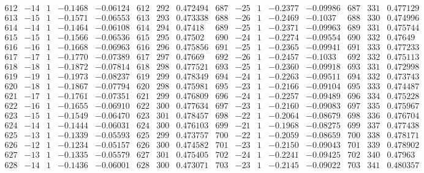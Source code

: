 \documentclass[11pt,reqno,a4letter]{article}
\numberwithin{figure}{section}
\numberwithin{table}{section}
\theoremstyle{plain}
\numberwithin{theorem}{section}
\theoremstyle{definition}
\begin{document}
\begin{table}[ht]
\begin{equation*}
{\begin{array}{ccccc|ccc|ccccc|ccc}
 612 & -14 & 1 & -0.1468 & -0.06124 & 612 & 292 & 0.472494 & 687 & -25 & 1 & -0.2377 & -0.09986 & 687 & 331 & 0.477129 \\
 613 & -15 & 1 & -0.1571 & -0.06553 & 613 & 293 & 0.473338 & 688 & -26 & 1 & -0.2469 & -0.1037 & 688 & 330 & 0.474996 \\
 614 & -14 & 1 & -0.1464 & -0.06108 & 614 & 294 & 0.47418 & 689 & -25 & 1 & -0.2371 & -0.09963 & 689 & 331 & 0.475744 \\
 615 & -15 & 1 & -0.1566 & -0.06536 & 615 & 295 & 0.47502 & 690 & -24 & 1 & -0.2274 & -0.09554 & 690 & 332 & 0.47649 \\
 616 & -16 & 1 & -0.1668 & -0.06963 & 616 & 296 & 0.475856 & 691 & -25 & 1 & -0.2365 & -0.09941 & 691 & 333 & 0.477233 \\
 617 & -17 & 1 & -0.1770 & -0.07389 & 617 & 297 & 0.47669 & 692 & -26 & 1 & -0.2457 & -0.1033 & 692 & 332 & 0.475113 \\
 618 & -18 & 1 & -0.1872 & -0.07814 & 618 & 298 & 0.477521 & 693 & -25 & 1 & -0.2360 & -0.09918 & 693 & 331 & 0.472998 \\
 619 & -19 & 1 & -0.1973 & -0.08237 & 619 & 299 & 0.478349 & 694 & -24 & 1 & -0.2263 & -0.09511 & 694 & 332 & 0.473743 \\
 620 & -18 & 1 & -0.1867 & -0.07794 & 620 & 298 & 0.475981 & 695 & -23 & 1 & -0.2166 & -0.09104 & 695 & 333 & 0.474487 \\
 621 & -17 & 1 & -0.1761 & -0.07351 & 621 & 299 & 0.476809 & 696 & -24 & 1 & -0.2257 & -0.09489 & 696 & 334 & 0.475228 \\
 622 & -16 & 1 & -0.1655 & -0.06910 & 622 & 300 & 0.477634 & 697 & -23 & 1 & -0.2160 & -0.09083 & 697 & 335 & 0.475967 \\
 623 & -15 & 1 & -0.1549 & -0.06470 & 623 & 301 & 0.478457 & 698 & -22 & 1 & -0.2064 & -0.08679 & 698 & 336 & 0.476704 \\
 624 & -14 & 1 & -0.1444 & -0.06031 & 624 & 300 & 0.476103 & 699 & -21 & 1 & -0.1968 & -0.08275 & 699 & 337 & 0.477438 \\
 625 & -13 & 1 & -0.1339 & -0.05593 & 625 & 299 & 0.473757 & 700 & -22 & 1 & -0.2059 & -0.08659 & 700 & 338 & 0.478171 \\
 626 & -12 & 1 & -0.1234 & -0.05157 & 626 & 300 & 0.474582 & 701 & -23 & 1 & -0.2150 & -0.09043 & 701 & 339 & 0.478902 \\
 627 & -13 & 1 & -0.1335 & -0.05579 & 627 & 301 & 0.475405 & 702 & -24 & 1 & -0.2241 & -0.09425 & 702 & 340 & 0.47963 \\
 628 & -14 & 1 & -0.1436 & -0.06001 & 628 & 300 & 0.473071 & 703 & -23 & 1 & -0.2145 & -0.09022 & 703 & 341 & 0.480357 \\

\end{array}}
\end{equation*}
\end{table}
\end{document}
